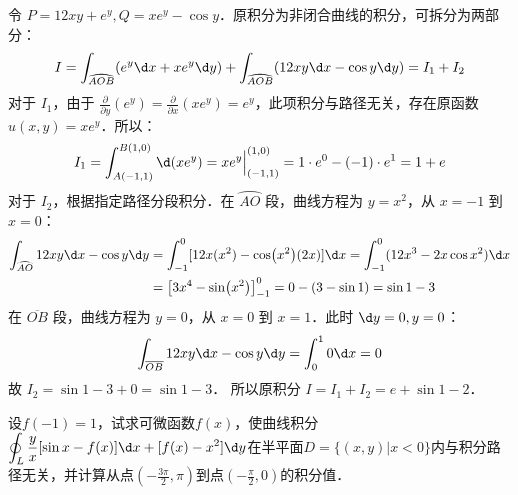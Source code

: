 \documentclass[12pt, a4paper, oneside, UTF8]{ctexbook}
\begin{document}
\begin{solution}
    令 $P = 12xy+e^y, Q = x e^y - \cos y$．原积分为非闭合曲线的积分，可拆分为两部分：
    \[ I = \int_{\wideparen{AOB}} (e^y \d x + x e^y \d y) + \int_{\wideparen{AOB}} (12xy \d x - \cos y \d y) = I_1 + I_2 \]
    对于 $I_1$，由于 $\frac{\partial}{\partial y}(e^y) = \frac{\partial}{\partial x}(x e^y) = e^y$，此项积分与路径无关，存在原函数 $u(x,y) = x e^y$．所以：
    \[ I_1 = \int_{A(-1,1)}^{B(1,0)} \d (x e^y) = x e^y \Big|_{(-1,1)}^{(1,0)} = 1 \cdot e^0 - (-1) \cdot e^1 = 1 + e \]
    对于 $I_2$，根据指定路径分段积分．在 $\wideparen{AO}$ 段，曲线方程为 $y=x^2$，从 $x=-1$ 到 $x=0$：
    \begin{align*}
        \int_{\wideparen{AO}} 12xy \d x - \cos y \d y &= \int_{-1}^0 [12x(x^2) - \cos(x^2)(2x)] \d x = \int_{-1}^0 (12x^3 - 2x\cos x^2) \d x \\
        &= \left[ 3x^4 - \sin(x^2) \right]_{-1}^0 = 0 - (3 - \sin 1) = \sin 1 - 3
    \end{align*}
    在 $\overline{OB}$ 段，曲线方程为 $y=0$，从 $x=0$ 到 $x=1$．此时 $\d y = 0, y=0$：
    \[ \int_{\overline{OB}} 12xy \d x - \cos y \d y = \int_0^1 0 \d x = 0 \]
    故 $I_2 = \sin 1 - 3 + 0 = \sin 1 - 3$．
    所以原积分 $I = I_1 + I_2 = \boxed{e + \sin 1 - 2}$．
\end{solution}
\begin{exercise}
    设$f(-1)=1$，试求可微函数$f(x)$，使曲线积分$\displaystyle\oint_L \frac{y}{x}[\sin x-f(x)]\d x+[f(x)-x^2]\d y$在半平面$D=\{(x,y)|x<0\}$内与积分路径无关，并计算从点$(-\frac{3\pi}{2},\pi)$到点$(-\frac{\pi}{2},0)$的积分值．
\end{exercise}
\end{document}

